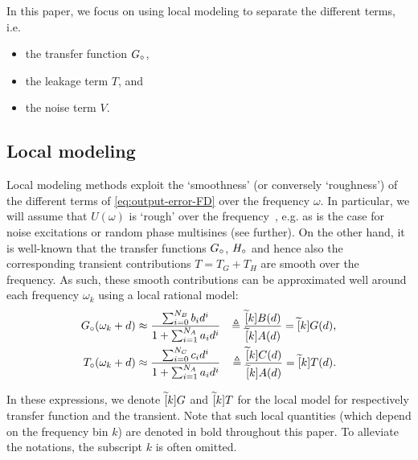 In this paper, we focus on using local modeling to separate the different terms, i.e.
\begin{itemize}
  \item the transfer function ${G}_{\circ}$,
  \item the leakage term $T$, and
  \item the noise term $V$.
\end{itemize}

\subsection{Local modeling}
Local modeling methods  exploit the `smoothness' (or conversely `roughness') of the different terms of \eqref{eq:output-error-FD} over the frequency $\omega$.
In particular, we will assume that $U(\omega)$ is `rough' over the frequency~\citep{Schoukens2009LPM}, e.g. as is the case for noise excitations or random phase multisines (see further).
On the other hand, it is well-known that the transfer functions ${G}_{\circ}$, ${H}_{\circ}$ and hence also the corresponding transient contributions $T = T_G + T_H$ are smooth over the frequency.
As such, these smooth contributions can be approximated well around each frequency $\omega_k$ using a local rational model:
\begin{align}
  \true{G}(\omega_{k}+d) 
  &\approx
  \frac{\sum_{i=0}^{N_B} b_i d^i}
            {1 + \sum_{i=1}^{N_A} a_i d^i}
    &\isdef
    \frac{\LocalModel[k]{B}(d)}%
           {\LocalModel[k]{A}(d)} 
           = \LocalModel[k]{G}(d)
  \text{,}
  \label{eq:LRM:model:G}
  \\
  \true{T}(\omega_k + d) &\approx
  \frac{\sum_{i=0}^{N_C} c_i d^i}
            {1 + \sum_{i=1}^{N_A} a_i d^i}
    &\isdef 
      \frac{\LocalModel[k]{C}(d)}%
           {\LocalModel[k]{A}(d)}
      = \LocalModel[k]{T}(d)
  \text{.}
  \label{eq:LRM:model:T}
\end{align}

In these expressions, we denote $\widetilde{[}k]{G}$ and $\widetilde{[}k]{T}$ for the local model for respectively transfer function and the transient.
Note that such local quantities (which depend on the frequency bin $k$) are denoted in bold throughout this paper.
To alleviate the notations, the subscript $k$ is often omitted.

